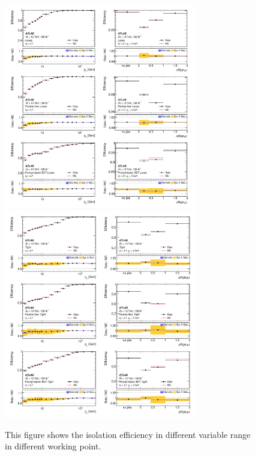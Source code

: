 \begin{figure}[!htb]
    \begin{center}
        \includegraphics[width=0.75\textwidth]{figures/common_ana/IsolationEff1}
        \includegraphics[width=0.75\textwidth]{figures/common_ana/IsolationEff2}
        \caption{
            This figure shows the isolation efficiency in different variable range in different working point\cite{Aad:2746302}.
        }
        \label{fig:isolationWP}
    \end{center}
\end{figure}


